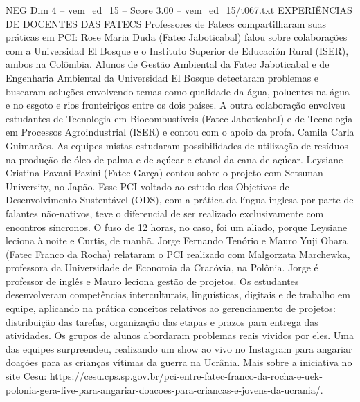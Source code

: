 \begin{textsample}{NEG Dim 4 – vem\_ed\_15 – Score 3.00 – vem\_ed\_15/t067.txt}  \label{ex:f4_neg_053}
EXPERIÊNCIAS DE DOCENTES DAS FATECS Professores de Fatecs compartilharam suas práticas em PCI: Rose Maria Duda (Fatec Jaboticabal) falou sobre colaborações com a Universidad El Bosque e o Instituto Superior de Educación Rural (ISER), ambos na Colômbia.
Alunos de Gestão Ambiental da Fatec Jaboticabal e de Engenharia Ambiental da Universidad El Bosque detectaram problemas e buscaram soluções envolvendo temas como qualidade da água, poluentes na água e no esgoto e rios fronteiriços entre os dois países.
A outra colaboração envolveu estudantes de Tecnologia em Biocombustíveis (Fatec Jaboticabal) e de Tecnologia em Processos Agroindustrial (ISER) e contou com o apoio da profa.
Camila Carla Guimarães.
As equipes mistas estudaram possibilidades de utilização de resíduos na produção de óleo de palma e de açúcar e etanol da cana-de-açúcar.
Leysiane Cristina Pavani Pazini (Fatec Garça) contou sobre o projeto com Setsunan University, no Japão.
Esse PCI voltado ao estudo dos Objetivos de Desenvolvimento Sustentável (ODS), com a prática da língua inglesa por parte de falantes não-nativos, teve o diferencial de ser realizado exclusivamente com encontros síncronos.
O fuso de 12 horas, no caso, foi um aliado, porque Leysiane leciona à noite e Curtis, de manhã.
Jorge Fernando Tenório e Mauro Yuji Ohara (Fatec Franco da Rocha) relataram o PCI realizado com Malgorzata Marchewka, professora da Universidade de Economia da Cracóvia, na Polônia.
Jorge é professor de inglês e Mauro leciona gestão de projetos.
Os estudantes desenvolveram competências interculturais, linguísticas, digitais e de trabalho em equipe, aplicando na prática conceitos relativos ao gerenciamento de projetos: distribuição das tarefas, organização das etapas e prazos para entrega das atividades.
Os grupos de alunos abordaram problemas reais vividos por eles.
Uma das equipes surpreendeu, realizando um show ao vivo no Instagram para angariar doações para as crianças vítimas da guerra na Ucrânia.
Mais sobre a iniciativa no site Cesu: https://cesu.cps.sp.gov.br/pci-entre-fatec-franco-da-rocha-e-uek-polonia-gera-live-para-angariar-doacoes-para-criancas-e-jovens-da-ucrania/.

\end{textsample}
